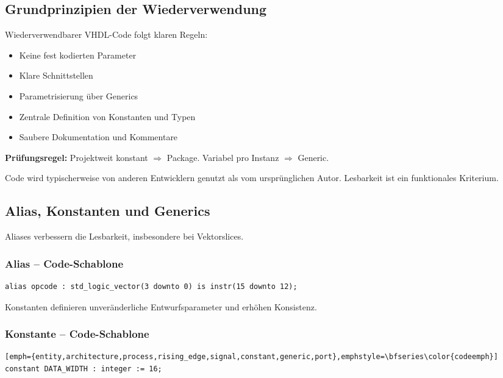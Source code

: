 \documentclass[10pt,a4paper]{article}
\newcommand{\hilite}[1]{\colorbox{yellow!25}{#1}}
\newcommand{\imp}[1]{\textbf{\textcolor{codeemph}{#1}}}
\begin{document}
\begin{multicols}{3}
\subsection{Grundprinzipien der Wiederverwendung}
Wiederverwendbarer VHDL-Code folgt klaren Regeln:
\begin{itemize}
  \item Keine fest kodierten Parameter
  \item Klare Schnittstellen
  \item Parametrisierung über Generics
  \item Zentrale Definition von Konstanten und Typen
  \item Saubere Dokumentation und Kommentare
\end{itemize}

\imp{Prüfungsregel:}  
\hilite{Projektweit} konstant $\Rightarrow$ \hilite{Package}. Variabel pro Instanz $\Rightarrow$ \hilite{Generic}.

Code wird typischerweise von anderen Entwicklern genutzt als vom ursprünglichen Autor. Lesbarkeit ist ein funktionales Kriterium.

\subsection{Alias, Konstanten und Generics}
Aliases verbessern die Lesbarkeit, insbesondere bei Vektorslices.

\subsubsection*{Alias – Code-Schablone}
\begin{lstlisting}[emph={entity,architecture,process,rising_edge,signal,constant,generic,port},emphstyle=\bfseries\color{codeemph}]
alias opcode : std_logic_vector(3 downto 0) is instr(15 downto 12);
\end{lstlisting}

Konstanten definieren unveränderliche Entwurfsparameter und erhöhen Konsistenz.

\subsubsection*{Konstante – Code-Schablone}
\begin{lstlisting}[emph={entity,architecture,process,rising_edge,signal,constant,generic,port},emphstyle=\bfseries\color{codeemph}][emph={entity,architecture,process,rising_edge,signal,constant,generic,port},emphstyle=\bfseries\color{codeemph}]
constant DATA_WIDTH : integer := 16;
\end{lstlisting}


\end{multicols}
\end{document}
